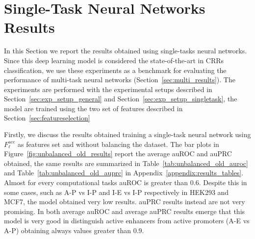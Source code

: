\section{Single-Task Neural Networks Results}
\label{sec:single_results}
In this Section we report the results obtained using single-tasks neural networks. Since this deep learning model is considered the state-of-the-art in CRRs classification, we use these experiments as a benchmark for evaluating the performance of multi-task neural networks (Section~\ref{sec:multi_results}). The experiments are performed with the experimental setups described in Section~\ref{sec:exp_setup_general} and Section~\ref{sec:exp_setup_singletask}, the model are trained using the two set of features described in Section~\ref{sec:featureselection} 

Firstly, we discuss the results obtained training a single-task neural network using $F_\ell^{\textrm{acc}}$ as features set and without balancing the dataset. The bar plots in Figure~\ref{fig:unbalanced_old_results} report the average auROC and auPRC obtained, the same results are summarized in Table~\ref{tab:unbalanced_old_auroc} and Table~\ref{tab:unbalanced_old_auprc} in Appendix~\ref{appendix:results_tables}. Almost for every computational tasks auROC is greater than 0.6. Despite this in some cases, such as A-P vs I-P and I-E vs I-P respectively in HEK293 and MCF7, the model obtained very low results. auPRC results instead are not very promising. In both average auROC and average auPRC results emerge that this model is very good in distinguish active enhancers from active promoters (A-E vs A-P) obtaining always values greater than 0.9.
